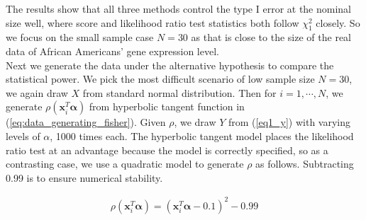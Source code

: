\documentclass[aoas,preprint]{imsart}
\numberwithin{equation}{section}
\theoremstyle{plain}
\begin{document}
The results show that all three methods control the type I error at the nominal size well, where score and likelihood ratio test statistics both follow $\chi_1^2$ closely. So we focus on the small sample case $N=30$ as that is close to the size of the real data of African Americans' gene expression level.\\

Next we generate the data under the alternative hypothesis to compare the statistical power. We pick the most difficult scenario of low sample size $N=30$, we again draw $X$ from standard normal distribution. Then for $i = 1, \cdots, N$, we generate $\rho(\bm{x}_i^T\bm{\alpha})$ from hyperbolic tangent function in (\ref{eq:data_generating_fisher}). Given $\rho$, we draw $Y$ from (\ref{eq1_y}) with varying levels of $\alpha$, 1000 times each. The hyperbolic tangent model places the likelihood ratio test at an advantage because the model is correctly specified, so as a contrasting case, we use a quadratic model to generate $\rho$ as follows. Subtracting 0.99 is to ensure numerical stability.

\begin{align}
    \rho(\bm{x}_i^T\bm{\alpha}) = (\bm{x}_i^T\bm{\alpha} - 0.1)^2 - 0.99
    \label{eq:data_generating2_quadratic}
\end{align}
\end{document}
